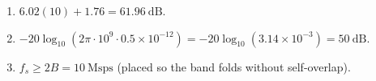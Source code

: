 \begin{enumerate}[leftmargin=1.6em,itemsep=2pt]
\item $6.02(10) + 1.76 = 61.96\ \text{dB}$.
\item $-20\log_{10}(2\pi\cdot10^{9}\cdot0.5\times10^{-12}) = -20\log_{10}(3.14\times10^{-3}) = 50\ \text{dB}$.
\item $f_s \ge 2B = 10\ \text{Msps}$ (placed so the band folds without self-overlap).
\end{enumerate}
